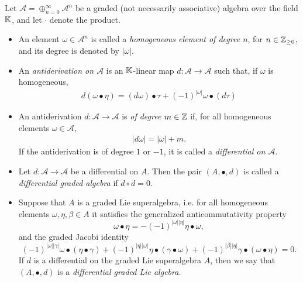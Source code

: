 \begin{definition} \label{defnDiffGAlgebraLieALgebraMorphism}
Let $\mathcal A = \oplus_{n = 0}^\infty \mathcal A^n$ be a graded (not necessarily associative) algebra over the field $\mathbb{K}$, and let $\cdot$ denote the product.
    \begin{itemize}
    
    \item An element $\omega \in \mathcal A^n$ is called a \emph{homogeneous element of degree $n$}, for $n \in \mathbb{Z}_{\geq 0}$, and its degree is denoted by $|\omega|$.
    
    \item An \emph{antiderivation on $\mathcal A$} is an $\mathbb{K}$-linear map $d: \mathcal A \to \mathcal A$ such that, if $\omega$ is homogeneous, 
    \begin{align}\label{equationDefinitionGradedLeibnizInDifferentialGradedAlgebra}
        d(\omega \bullet \eta) = (d\omega)\bullet\tau + (-1)^{|\omega|} \omega \bullet (d\tau)
    \end{align}
    
    \item An antiderivation $d: \mathcal A \to \mathcal A$ is \emph{of degree $m \in \mathbb{Z}$} if, for all homogeneous elements $\omega \in \mathcal A$,
    \begin{align}
        |d\omega| = |\omega| + m.
    \end{align}
    If the antiderivation is of degree $1$ or $-1$, it is called a \emph{differential on $\mathcal A$}.
    
    \item Let $d: \mathcal A \to \mathcal A$ be a differential on $A$. Then the pair $(A, \bullet, d)$ is called a \emph{differential graded algebra} if $d \circ d = 0$. 
    
    \item Suppose that $A$ is a graded Lie superalgebra, i.e. for all homogeneous elements $\omega, \eta, \beta \in A$ it satisfies the generalized anticommutativity property
    \begin{equation}\label{equationGradedCommutativeMinusGeneral}
        \omega \bullet \eta = -(-1)^{|\omega||\eta|} \eta \bullet \omega,
    \end{equation}
    and the graded Jacobi identity
    \begin{equation}\label{gradedJacobiIdentityGeneralizedAssociativity}
        (-1)^{|\omega||\gamma|} \omega \bullet (\eta \bullet \gamma) +
        (-1)^{|\eta||\omega|} \eta \bullet (\gamma \bullet \omega) +
        (-1)^{|\beta||\eta|} \gamma \bullet (\omega \bullet \eta) = 0.
    \end{equation}
    If $d$ is a differential on the graded Lie superalgebra $A$, then we say that $(A, \bullet, d)$ is a \emph{differential graded Lie algebra}.
    

\end{itemize}
\end{definition}
